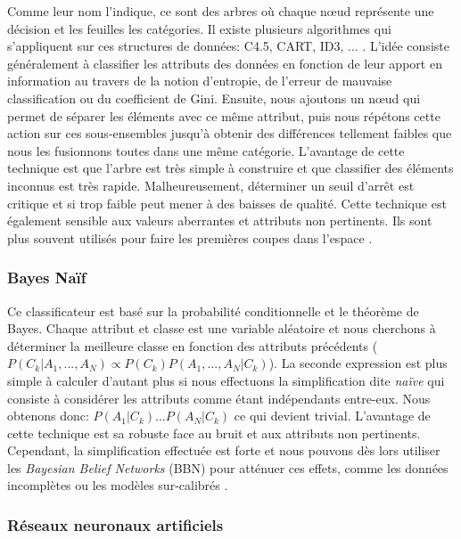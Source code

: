 Comme leur nom l'indique, ce sont des arbres où chaque nœud représente une décision et les feuilles les catégories. Il existe plusieurs algorithmes qui s'appliquent sur ces structures de données: C4.5, CART, ID3, ... \cite{quinlan1986induction}. L'idée consiste généralement à classifier les attributs des données en fonction de leur apport en information au travers de la notion d'entropie, de l'erreur de mauvaise classification ou du coefficient de Gini. Ensuite, nous ajoutons un nœud qui permet de séparer les éléments avec ce même attribut, puis nous répétons cette action sur ces sous-ensembles jusqu'à obtenir des différences tellement faibles que nous les fusionnons toutes dans une même catégorie. L'avantage de cette technique est que l'arbre est très simple à construire et que classifier des éléments inconnus est très rapide. Malheureusement, déterminer un seuil d'arrêt est critique et si trop faible peut mener à des baisses de qualité. Cette technique est également sensible aux valeurs aberrantes et attributs non pertinents. Ils sont plus souvent utilisés pour faire les premières coupes dans l'espace \cite{maimon2005data}.

\subsubsection{Bayes Naïf}

Ce classificateur est basé sur la probabilité conditionnelle et le théorème de Bayes. Chaque attribut et classe est une variable aléatoire et nous cherchons à déterminer la meilleure classe en fonction des attributs précédents ($P(C_{k} | A_{1}, ..., A_{N}) \propto P(C_{k})P(A_{1}, ..., A_{N} |C_{k})$). La seconde expression est plus simple à calculer d'autant plus si nous effectuons la simplification dite \textit{naïve} qui consiste à considérer les attributs comme étant indépendants entre-eux. Nous obtenons donc: $P(A_{1} | C_{k}) ... P(A_{N} | C_{k})$ ce qui devient trivial. L'avantage de cette technique est sa robuste face au bruit et aux attributs non pertinents. Cependant, la simplification effectuée est forte et nous pouvons dès lors utiliser les \textit{Bayesian Belief Networks} (BBN) pour atténuer ces effets, comme les données incomplètes ou les modèles sur-calibrés \cite{friedman1997bayesian}.

\subsubsection{Réseaux neuronaux artificiels}

